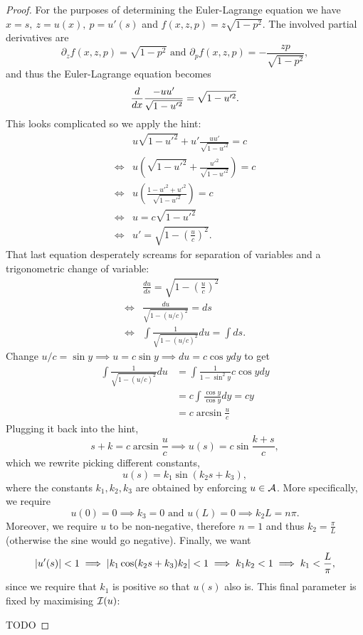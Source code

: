 \begin{proof}
  For the purposes of determining the Euler-Lagrange equation we have $x = s,\
  z = u(x),\ p = u'(s)$ and $f(x, z, p) = z\sqrt{1 - p^2}$. The involved
  partial derivatives are
  \[
    \partial_z f(x, z, p) = \sqrt{1 - p^2} \text{ and }
    \partial_p f(x, z, p) = - \frac{zp}{\sqrt{1 - p^2}},
  \]
  and thus the Euler-Lagrange equation becomes
  \[
    \frac{d}{dx} \frac{- u u'}{\sqrt{1 - u'^2}} = \sqrt{1 - u'^2}.
  \]
  This looks complicated so we apply the hint:
  \begin{align*}
    & u\sqrt{1 - u'^2} + u' \frac{uu'}{\sqrt{1 - u'^2}} = c \\
    \iff & u \left( \sqrt{1 - u'^2} + \frac{u'^2}{\sqrt{1 - u'^2}}\right) = c \\
    \iff & u \left( \frac{1 - u'^2 + u'^2}{\sqrt{1 - u'^2}}\right) = c \\
    \iff & u = c\sqrt{1 - u'^2} \\
    \iff & u' = \sqrt{1 - \left( \frac{u}{c} \right)^2}.
  \end{align*}
  That last equation desperately screams for separation of variables and a
  trigonometric change of variable:
  \begin{align*}
    & \frac{du}{ds} = \sqrt{1 - \left( \frac{u}{c} \right)^2} \\
    \iff &\frac{du}{\sqrt{1 - (u/c)^2}} = ds \\
    \iff & \int \frac{1}{\sqrt{1 - (u/c)^2}} du = \int ds.
  \end{align*}
  Change $u / c = \sin y \implies u = c\sin y \implies du = c\cos y dy$ to get
  \begin{align*}
    \int \frac{1}{\sqrt{1 - (u/c)^2}} du
  & = \int \frac{1}{1 - \sin^2 y} c \cos y dy \\
  &= c \int \frac{\cos y}{\cos y} dy = cy \\
  &= c\arcsin\frac{u}{c}
  \end{align*}
  Plugging it back into the hint,
  \[
    s + k = c\arcsin\frac{u}{c} \implies u(s) = c\sin \frac{k+s}{c},
  \]
  which we rewrite picking different constants,
  \[
    u(s) = k_1 \sin( k_2 s + k_3),
  \]
  where the constants $k_1, k_2, k_3$ are obtained by enforcing $u \in \mathcal{A}$.
  More specifically, we require
  \[
    u(0) = 0 \implies k_3 = 0\text{ and } u(L) = 0 \implies k_2 L = n\pi.
  \]
  Moreover, we require $u$ to be non-negative, therefore $n = 1$ and thus $k_2
  = \frac{\pi}{L}$ (otherwise the sine would go negative). Finally, we want
  \[
    \left\vert{u'(s)}\right\vert < 1 \implies \left\vert{k_1\cos(k_2s + k_3) k_2}\right\vert < 1
    \implies k_1 k_2 < 1 \implies k_1 < \frac{L}{\pi},
  \]
  since we require that $k_1$ is positive so that $u(s)$ also is. This final
  parameter is fixed by maximising $\mathcal{I}(u)$:

  TODO
\end{proof}


